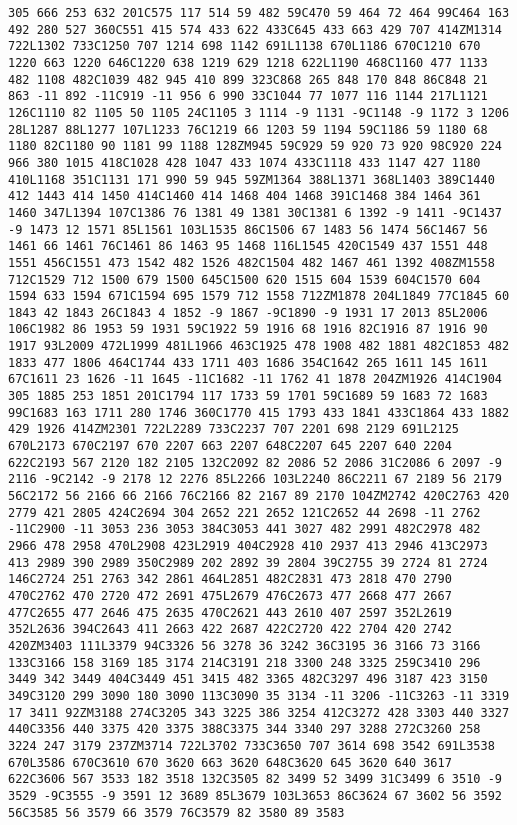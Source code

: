 \documentclass[
]{article}
\begin{document}
\begin{verbatim}
305 666 253 632 201C575 117 514 59 482 59C470 59 464 72 464 99C464 163 492 280 527 360C551 415 574 433 622 433C645 433 663 429 707 414ZM1314 722L1302 733C1250 707 1214 698 1142 691L1138 670L1186 670C1210 670 1220 663 1220 646C1220 638 1219 629 1218 622L1190 468C1160 477 1133 482 1108 482C1039 482 945 410 899 323C868 265 848 170 848 86C848 21 863 -11 892 -11C919 -11 956 6 990 33C1044 77 1077 116 1144 217L1121 126C1110 82 1105 50 1105 24C1105 3 1114 -9 1131 -9C1148 -9 1172 3 1206 28L1287 88L1277 107L1233 76C1219 66 1203 59 1194 59C1186 59 1180 68 1180 82C1180 90 1181 99 1188 128ZM945 59C929 59 920 73 920 98C920 224 966 380 1015 418C1028 428 1047 433 1074 433C1118 433 1147 427 1180 410L1168 351C1131 171 990 59 945 59ZM1364 388L1371 368L1403 389C1440 412 1443 414 1450 414C1460 414 1468 404 1468 391C1468 384 1464 361 1460 347L1394 107C1386 76 1381 49 1381 30C1381 6 1392 -9 1411 -9C1437 -9 1473 12 1571 85L1561 103L1535 86C1506 67 1483 56 1474 56C1467 56 1461 66 1461 76C1461 86 1463 95 1468 116L1545 420C1549 437 1551 448 1551 456C1551 473 1542 482 1526 482C1504 482 1467 461 1392 408ZM1558 712C1529 712 1500 679 1500 645C1500 620 1515 604 1539 604C1570 604 1594 633 1594 671C1594 695 1579 712 1558 712ZM1878 204L1849 77C1845 60 1843 42 1843 26C1843 4 1852 -9 1867 -9C1890 -9 1931 17 2013 85L2006 106C1982 86 1953 59 1931 59C1922 59 1916 68 1916 82C1916 87 1916 90 1917 93L2009 472L1999 481L1966 463C1925 478 1908 482 1881 482C1853 482 1833 477 1806 464C1744 433 1711 403 1686 354C1642 265 1611 145 1611 67C1611 23 1626 -11 1645 -11C1682 -11 1762 41 1878 204ZM1926 414C1904 305 1885 253 1851 201C1794 117 1733 59 1701 59C1689 59 1683 72 1683 99C1683 163 1711 280 1746 360C1770 415 1793 433 1841 433C1864 433 1882 429 1926 414ZM2301 722L2289 733C2237 707 2201 698 2129 691L2125 670L2173 670C2197 670 2207 663 2207 648C2207 645 2207 640 2204 622C2193 567 2120 182 2105 132C2092 82 2086 52 2086 31C2086 6 2097 -9 2116 -9C2142 -9 2178 12 2276 85L2266 103L2240 86C2211 67 2189 56 2179 56C2172 56 2166 66 2166 76C2166 82 2167 89 2170 104ZM2742 420C2763 420 2779 421 2805 424C2694 304 2652 221 2652 121C2652 44 2698 -11 2762 -11C2900 -11 3053 236 3053 384C3053 441 3027 482 2991 482C2978 482 2966 478 2958 470L2908 423L2919 404C2928 410 2937 413 2946 413C2973 413 2989 390 2989 350C2989 202 2892 39 2804 39C2755 39 2724 81 2724 146C2724 251 2763 342 2861 464L2851 482C2831 473 2818 470 2790 470C2762 470 2720 472 2691 475L2679 476C2673 477 2668 477 2667 477C2655 477 2646 475 2635 470C2621 443 2610 407 2597 352L2619 352L2636 394C2643 411 2663 422 2687 422C2720 422 2704 420 2742 420ZM3403 111L3379 94C3326 56 3278 36 3242 36C3195 36 3166 73 3166 133C3166 158 3169 185 3174 214C3191 218 3300 248 3325 259C3410 296 3449 342 3449 404C3449 451 3415 482 3365 482C3297 496 3187 423 3150 349C3120 299 3090 180 3090 113C3090 35 3134 -11 3206 -11C3263 -11 3319 17 3411 92ZM3188 274C3205 343 3225 386 3254 412C3272 428 3303 440 3327 440C3356 440 3375 420 3375 388C3375 344 3340 297 3288 272C3260 258 3224 247 3179 237ZM3714 722L3702 733C3650 707 3614 698 3542 691L3538 670L3586 670C3610 670 3620 663 3620 648C3620 645 3620 640 3617 622C3606 567 3533 182 3518 132C3505 82 3499 52 3499 31C3499 6 3510 -9 3529 -9C3555 -9 3591 12 3689 85L3679 103L3653 86C3624 67 3602 56 3592 56C3585 56 3579 66 3579 76C3579 82 3580 89 3583 
\end{verbatim}
\end{document}
